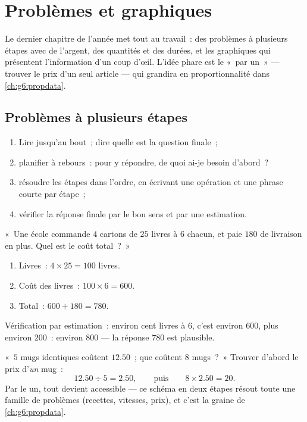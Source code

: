 \chapter{Problèmes et graphiques}\label{ch:g5:data}

Le dernier chapitre de l'année met tout au travail~: des problèmes
à plusieurs étapes avec de l'argent, des quantités et des durées, et
les graphiques qui présentent l'information d'un coup d'œil.
L'idée phare est le «~par un~» --- trouver le prix d'un seul
article --- qui grandira en proportionnalité dans
\cref{ch:g6:propdata}.

\section{Problèmes à plusieurs étapes}

\begin{method}\label{met:g5:data:steps}
\begin{enumerate}
  \item Lire jusqu'au bout~; dire quelle est la question finale~;
  \item planifier à rebours~: pour y répondre, de quoi ai-je besoin
        d'abord~?
  \item résoudre les étapes dans l'ordre, en écrivant une opération
        et une phrase courte par étape~;
  \item vérifier la réponse finale par le bon sens et par une
        estimation.
\end{enumerate}
\end{method}

\begin{example}\label{ex:g5:data:multistep}
«~Une école commande $4$ cartons de $25$ livres à $6$ chacun, et
paie $180$ de livraison en plus. Quel est le coût total~?~»
\begin{enumerate}
  \item Livres~: $4 \times 25 = 100$ livres.
  \item Coût des livres~: $100 \times 6 = 600$.
  \item Total~: $600 + 180 = 780$.
\end{enumerate}
Vérification par estimation~: environ cent livres à $6$, c'est
environ $600$, plus environ $200$~: environ $800$ --- la réponse
$780$ est plausible.
\end{example}

\begin{example}[Par un]\label{ex:g5:data:perone}
«~$5$ mugs identiques coûtent $12.50$~; que coûtent $8$ mugs~?~»
Trouver d'abord le prix d'\emph{un} mug~:
\[
12.50 \div 5 = 2.50,
\qquad\text{puis}\qquad
8 \times 2.50 = 20 .
\]
Par le un, tout devient accessible --- ce schéma en deux étapes
résout toute une famille de problèmes (recettes, vitesses, prix),
et c'est la graine de \cref{ch:g6:propdata}.
\end{example}

